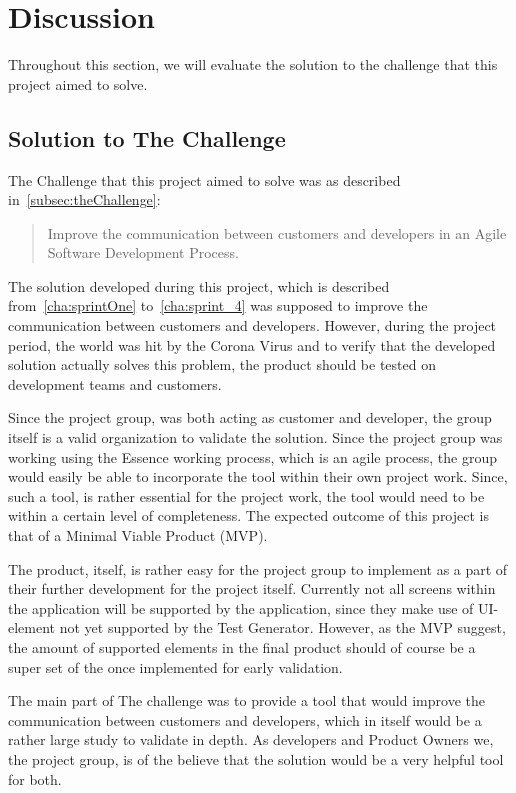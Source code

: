 \section{Discussion}

Throughout this section, we will evaluate the solution to the challenge that this project aimed to solve.

\subsection{Solution to The Challenge}

The Challenge that this project aimed to solve was as described in~\autoref{subsec:theChallenge}:

\begin{quote}
    Improve the communication between customers and developers in an Agile Software Development Process.
\end{quote}

The solution developed during this project, which is described from~\autoref{cha:sprintOne} to~\autoref{cha:sprint_4} was supposed to improve the communication between customers and developers.
However, during the project period, the world was hit by the Corona Virus and to verify that the developed solution actually solves this problem, the product should be tested on development teams and customers.

Since the project group, was both acting as customer and developer, the group itself is a valid organization to validate the solution.
Since the project group was working using the Essence working process, which is an agile process, the group would easily be able to incorporate the tool within their own project work.
Since, such a tool, is rather essential for the project work, the tool would need to be within a certain level of completeness.
The expected outcome of this project is that of a Minimal Viable Product (MVP).

The product, itself, is rather easy for the project group to implement as a part of their further development for the project itself.
Currently not all screens within the application will be supported by the application, since they make use of UI-element not yet supported by the Test Generator.
However, as the MVP suggest, the amount of supported elements in the final product should of course be a super set of the once implemented for early validation.

The main part of The challenge was to provide a tool that would improve the communication between customers and developers, which in itself would be a rather large study to validate in depth.
As developers and Product Owners we, the project group, is of the believe that the solution would be a very helpful tool for both.
